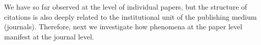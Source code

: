 We have so far observed at the level of individual papers, but the structure of citations is also deeply related to the institutional unit of the publishing medium (journals). Therefore, next we investigate how phenomena at the paper level manifest at the journal level.
